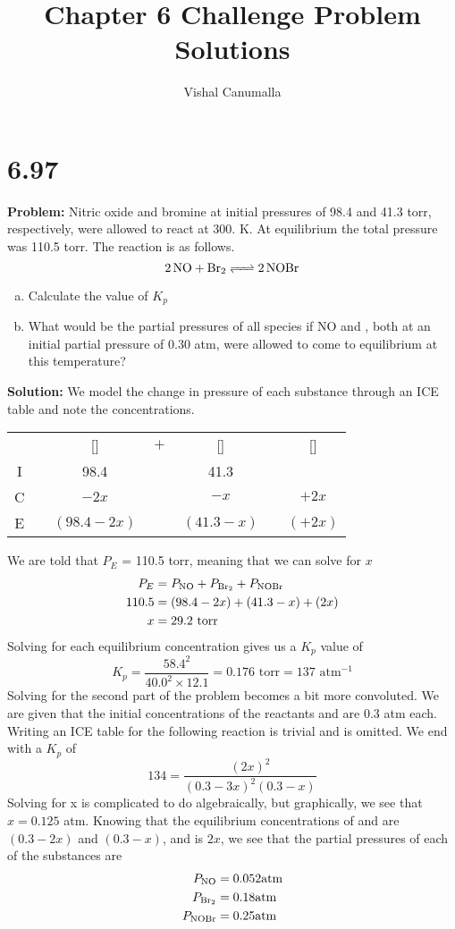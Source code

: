 \documentclass[11 pt]{article}
\title{Chapter 6 Challenge Problem Solutions}
\author{Vishal Canumalla}
\makeatletter
\newcommand{\icetable}[9]{
    \begin{tabular}{cc@{}c@{}c@{}c@{}c@{}c}

    & &   [\ce{#2#1}]& ${}+{}$ & [\ce{#4#3}] & \ce{<=>}& [\ce{#6#5}]\\
 
  I & &       #7    &&   #8                      &&  #9    \\
  C & &       $- #2x$    &&   $- #4x$                         &&  $+ #6x$    \\
  E & &       $(#7 - #2x)$    &&   $(#8 - #4x)$                         &&  $(#9 + #6x)$    \\
 
\end{tabular}

}
\makeatother
\begin{document}
\maketitle

\section*{6.97} 

\textbf{Problem:} Nitric oxide and bromine at initial pressures of 98.4 and 41.3 torr, respectively, were allowed to react at 300. K. At equilibrium the total pressure was 110.5 torr. The reaction is as follows.
$$\ce{2NO + Br2 <=> 2NOBr}$$
\begin{enumerate}[a)]
    \item Calculate the value of $K_p$
    \item What would be the partial pressures of all species if
NO and , both at an initial partial pressure of
0.30 atm, were allowed to come to equilibrium at
this temperature?
\end{enumerate}
\textbf{Solution:} We model the change in pressure of each substance through an ICE table and note the concentrations.
\begin{center}
 \icetable{NO}{2}{Br2}{}{NOBr}{2}{98.4}{41.3}{}
\end{center}
We are told that $P_{E}$ = 110.5 torr, meaning that we can solve for $x$
\begin{align*}
P_E &= P_{\ce{NO}} + P_{\ce{Br2}} + P_{\ce{NOBr}} \\
    110.5 &= (98.4 - 2x) + (41.3 - x) + (2x) \\
    x &= 29.2 \text{ torr}
\end{align*}
Solving for each equilibrium concentration gives us a $K_p$ value of 
$$K_p = \frac{58.4^2}{40.0^2 \times 12.1} = 0.176 \text{ torr} = \boxed{137 \text{ atm}^{-1}}$$
Solving for the second part of the problem becomes a bit more convoluted. We are given that the initial concentrations of the reactants  and  are 
0.3 atm each. Writing an ICE table for the following reaction is trivial and is omitted. We end with a $K_p$ of 
$$134 =  \frac{(2x)^2}{(0.3-3x)^2(0.3-x)}$$
Solving for x is complicated to do algebraically, but graphically, we see that $x = 0.125$ atm. Knowing
that the equilibrium concentrations of  and  are $(0.3 - 2x)$ and $(0.3 - x)$, and 
 is $2x$, we see that the partial pressures of each of the substances are
\begin{align*}
    P_{\ce{NO}} &= 0.052 \text{atm} \\
    P_{\ce{Br2}} &= 0.18 \text{atm} \\
    P_{\ce{NOBr}} &= 0.25 \text{atm}  
\end{align*}
\end{document}
